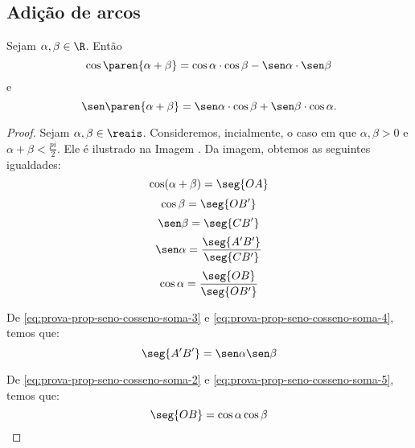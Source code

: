 \subsection{Adição de arcos}

\begin{proposition}
\label{prop:seno-e-cosseno-da-soma}
    Sejam $\alpha, \beta \in \R$. Então
$$\cos \paren{\alpha + \beta} = \cos \alpha \cdot \cos \beta - \sen
\alpha \cdot \sen \beta$$ e
$$\sen \paren{\alpha + \beta} = \sen \alpha \cdot \cos \beta +\sen \beta \cdot
\cos \alpha.$$
\end{proposition}

\begin{proof}
    Sejam $\alpha, \beta \in \reais$. Consideremos, incialmente, o caso em que 
    $\alpha,\beta>0$ e $\alpha+\beta < \frac{pi}{2}$. Ele é ilustrado na Imagem . %
    Da imagem, obtemos as seguintes igualdades:
    \begin{equation*}
        \cos(\alpha+\beta) = \seg{OA}
    \end{equation*}
    \begin{equation}
    \label{eq:prova-prop-seno-cosseno-soma-2}
        \cos\beta = \seg{OB^{\prime}}
    \end{equation}
    \begin{equation}
    \label{eq:prova-prop-seno-cosseno-soma-3}
        \sen\beta = \seg{CB^{\prime}}
    \end{equation} 
    \begin{equation}
    \label{eq:prova-prop-seno-cosseno-soma-4}
        \sen\alpha = \frac{\seg{A^{\prime}B^{\prime}}}{\seg{CB^{\prime}}}
    \end{equation}
    \begin{equation}
    \label{eq:prova-prop-seno-cosseno-soma-5}
        \cos\alpha = \frac{\seg{OB}}{\seg{OB^{\prime}}}
    \end{equation}

    De \ref{eq:prova-prop-seno-cosseno-soma-3} e \ref{eq:prova-prop-seno-cosseno-soma-4}, temos que:
    \begin{equation}
    \label{eq:prova-prop-seno-cosseno-soma-6}
        \seg{A^{\prime} B^{\prime}} = \sen \alpha \sen \beta
    \end{equation}

    De \ref{eq:prova-prop-seno-cosseno-soma-2} e \ref{eq:prova-prop-seno-cosseno-soma-5}, temos que:
    \begin{equation}
    \label{eq:prova-prop-seno-cosseno-soma-7}
        \seg{OB} = \cos \alpha \cos \beta
    \end{equation}


\end{proof}
